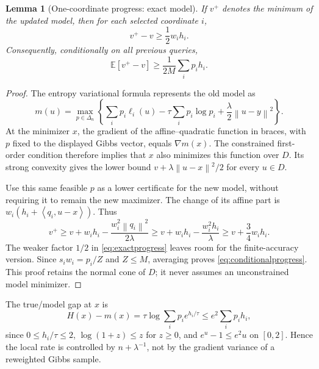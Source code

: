 \documentclass[11pt,a4paper]{article}
\newtheorem{lemma}[theorem]{Lemma}
\theoremstyle{definition}\newtheorem{definition}[theorem]{Definition}
\theoremstyle{remark}\newtheorem{remark}[theorem]{Remark}
\newcommand{\E}{\mathbb E}
\newcommand{\norm}[1]{\left\|#1\right\|}
\newcommand{\ip}[2]{\left\langle#1,#2\right\rangle}
\begin{document}
\begin{lemma}[One-coordinate progress: exact model]\label{lem:exactprogress}
If $v^+$ denotes the minimum of the updated model, then for each selected coordinate $i$,
\begin{equation}\label{eq:exactprogress}
 v^+-v\ge\frac12w_i h_i.
\end{equation}
Consequently, conditionally on all previous queries,
\begin{equation}\label{eq:conditionalprogress}
 \E[v^+-v]\ge\frac{1}{2M}\sum_i p_i h_i.
\end{equation}
\end{lemma}
\begin{proof}
The entropy variational formula represents the old model as
\[
 m(u)=\max_{p\in\Delta_n}
 \left\{\sum_i p_i\ell_i(u)-\tau\sum_i p_i\log p_i
             +\frac\lambda2\norm{u-y}^2\right\}.
\]
At the minimizer $x$, the gradient of the affine--quadratic function in
braces, with $p$ fixed to the displayed Gibbs vector, equals $\nabla m(x)$.
The constrained first-order condition therefore implies that $x$ also
minimizes this function over $D$. Its strong convexity gives the lower bound
$v+\lambda\norm{u-x}^2/2$ for every $u\in D$.

Use this same feasible $p$ as a lower certificate for the new model, without requiring it to remain the new maximizer. The change of its affine part is $w_i(h_i+\ip{q_i}{u-x})$. Thus
\[
 v^+\ge v+w_i h_i-\frac{w_i^2\norm{q_i}^2}{2\lambda}
 \ge v+w_i h_i-\frac{w_i^2 h_i}{\lambda}
 \ge v+\frac34w_i h_i.
\]
The weaker factor $1/2$ in \eqref{eq:exactprogress} leaves room for the finite-accuracy version. Since $s_iw_i=p_i/Z$ and $Z\le M$, averaging proves \eqref{eq:conditionalprogress}. This proof retains the normal cone of $D$; it never assumes an unconstrained model minimizer.
\end{proof}

The true/model gap at $x$ is
\begin{equation}\label{eq:gapcomparison}
 H(x)-m(x)=\tau\log\sum_i p_i e^{h_i/\tau}
 \le e^2\sum_i p_i h_i,
\end{equation}
since $0\le h_i/\tau\le2$, $\log(1+z)\le z$ for $z\ge0$,
and $e^u-1\le e^2u$ on $[0,2]$. Hence the local rate is controlled by $n+\lambda^{-1}$, not by the gradient variance of a reweighted Gibbs sample.
\end{document}
